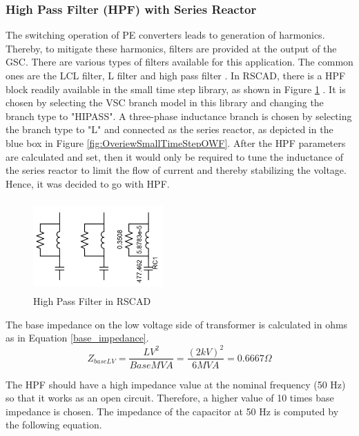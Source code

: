 \subsubsection{High Pass Filter (HPF) with Series Reactor}\label{HPF_design}
The switching operation of \gls{PE} converters leads to generation of harmonics. Thereby, to mitigate these harmonics, filters are provided at the output of the \gls{GSC}. There are various types of filters available for this application. The common ones are the LCL filter, L filter and high pass filter \cite{beres_review_2016}. In RSCAD, there is a \gls{HPF} block readily available in the small time step library, as shown in Figure \ref{fig:HPF} \cite{rtds_tech}. It is chosen by selecting the \gls{VSC} branch model in this library and changing the branch type to "HIPASS". A three-phase inductance branch is chosen by selecting the branch type to "L" and connected as the series reactor, as depicted in the blue box in Figure \ref{fig:OveriewSmallTimeStepOWF}. After the \gls{HPF} parameters are calculated and set, then it would only be required to tune the inductance of the series reactor to limit the flow of current and thereby stabilizing the voltage. Hence, it was decided to go with \gls{HPF}.

\begin{figure}[H]
\centering
    \includegraphics[height = 3.5cm,width = 5cm]{Diagrams/Chapter_3/HPF_RSCAD.PNG}
    \caption{High Pass Filter in RSCAD}
    \label{fig:HPF}
\end{figure}

The base impedance on the low voltage side of transformer is calculated in ohms as in Equation \ref{base_impedance}.
\begin{equation}\label{base_impedance}
    Z_{baseLV} = \frac{LV^2}{Base MVA} = \frac{(2 kV)^2}{6 MVA} = 0.6667\Omega  
\end{equation}

The \gls{HPF} should have a high impedance value at the nominal frequency (50 Hz) so that it works as an open circuit. Therefore, a higher value of 10 times base impedance is chosen. The impedance of the capacitor at 50 Hz is computed by the following equation.

